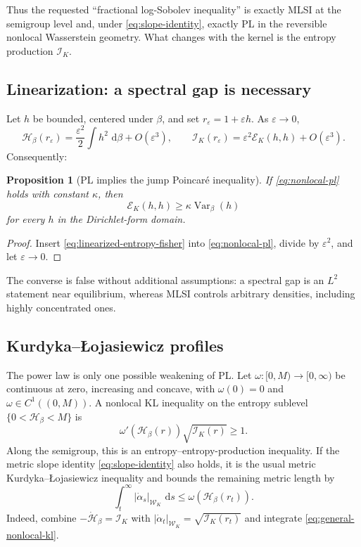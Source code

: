 \documentclass[11pt]{article}
\newtheorem{proposition}[theorem]{Proposition}
\theoremstyle{definition}
\DeclareMathOperator{\Var}{Var}
\newcommand{\dd}{\,\mathrm d}
\newcommand{\cE}{\mathcal E}
\newcommand{\cI}{\mathcal I}
\newcommand{\cH}{\mathcal H}
\newcommand{\cW}{\mathcal W}
\newcommand{\abs}[1]{\left\lvert #1\right\rvert}
\begin{document}
Thus the requested ``fractional log-Sobolev inequality'' is exactly MLSI at
the semigroup level and, under \eqref{eq:slope-identity}, exactly PL in the
reversible nonlocal Wasserstein geometry.  What changes with the kernel is
the entropy production $\cI_K$.

\subsection{Linearization: a spectral gap is necessary}

Let $h$ be bounded, centered under $\beta$, and set
$r_\varepsilon=1+\varepsilon h$.  As $\varepsilon\to0$,
\begin{equation}\label{eq:linearized-entropy-fisher}
  \cH_\beta(r_\varepsilon)
  =\frac{\varepsilon^2}{2}\int h^2\,\dd\beta+O(\varepsilon^3),
  \qquad
  \cI_K(r_\varepsilon)
  =\varepsilon^2\cE_K(h,h)+O(\varepsilon^3).
\end{equation}
Consequently:

\begin{proposition}[PL implies the jump Poincar\'e inequality]
\label{prop:pl-implies-gap}
If \eqref{eq:nonlocal-pl} holds with constant $\kappa$, then
\begin{equation}\label{eq:jump-poincare}
  \cE_K(h,h)\geq\kappa\Var_\beta(h)
\end{equation}
for every $h$ in the Dirichlet-form domain.
\end{proposition}

\begin{proof}
Insert \eqref{eq:linearized-entropy-fisher} into
\eqref{eq:nonlocal-pl}, divide by $\varepsilon^2$, and let
$\varepsilon\to0$.
\end{proof}

The converse is false without additional assumptions: a spectral gap is an
$L^2$ statement near equilibrium, whereas MLSI controls arbitrary densities,
including highly concentrated ones.

\subsection{Kurdyka--{\L}ojasiewicz profiles}

The power law is only one possible weakening of PL.  Let
$\omega:[0,M)\to[0,\infty)$ be continuous at zero, increasing and concave,
with $\omega(0)=0$ and $\omega\in C^1((0,M))$.  A nonlocal KL inequality on
the entropy sublevel $\{0<\cH_\beta<M\}$ is
\begin{equation}\label{eq:general-nonlocal-kl}
  \omega'(\cH_\beta(r))\sqrt{\cI_K(r)}\geq1.
\end{equation}
Along the semigroup, this is an entropy--entropy-production inequality.  If
the metric slope identity \eqref{eq:slope-identity} also holds, it is the
usual metric Kurdyka--{\L}ojasiewicz inequality and bounds the remaining
metric length by
\begin{equation}\label{eq:kl-tail-length}
  \int_t^\infty\abs{\dot\alpha_s}_{\cW_K}\,\dd s
  \leq \omega(\cH_\beta(r_t)).
\end{equation}
Indeed, combine $-\dot{\cH}_\beta=\cI_K$ with
$\abs{\dot\alpha_t}_{\cW_K}=\sqrt{\cI_K(r_t)}$ and integrate
\eqref{eq:general-nonlocal-kl}.
\end{document}
